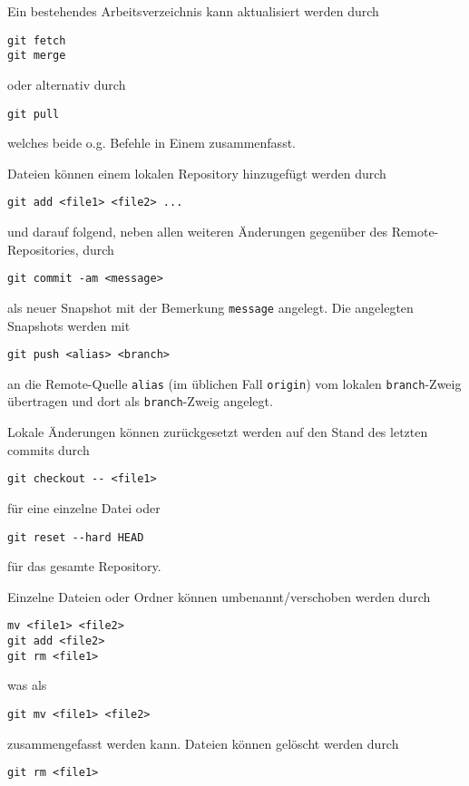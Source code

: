 \documentclass{scrartcl}
\begin{document}
\vspace{1.5\baselineskip}
Ein bestehendes Arbeitsverzeichnis kann aktualisiert werden durch
\begin{lstlisting}
git fetch
git merge
\end{lstlisting} 
oder alternativ durch 
\begin{lstlisting}
git pull
\end{lstlisting} 
welches beide o.g. Befehle in Einem zusammenfasst.

\vspace{1.5\baselineskip}
Dateien können einem lokalen Repository hinzugefügt werden durch
\begin{lstlisting}
git add <file1> <file2> ...
\end{lstlisting}
und darauf folgend, neben allen weiteren Änderungen gegenüber des Remote-Repositories, durch
\begin{lstlisting}
git commit -am <message>
\end{lstlisting}
als neuer Snapshot mit der Bemerkung \texttt{message} angelegt. Die angelegten Snapshots werden mit
\begin{lstlisting}
git push <alias> <branch>
\end{lstlisting}
an die Remote-Quelle \texttt{alias} (im üblichen Fall \texttt{origin}) vom lokalen \texttt{branch}-Zweig übertragen und dort als \texttt{branch}-Zweig angelegt.

\vspace{1.5\baselineskip}
Lokale Änderungen können zurückgesetzt werden auf den Stand des letzten commits durch
\begin{lstlisting}
git checkout -- <file1>
\end{lstlisting}
für eine einzelne Datei oder
\begin{lstlisting}
git reset --hard HEAD
\end{lstlisting}
für das gesamte Repository.

\vspace{1.5\baselineskip}
Einzelne Dateien oder Ordner können umbenannt/verschoben werden durch
\begin{lstlisting}
mv <file1> <file2>
git add <file2>
git rm <file1>
\end{lstlisting}
was als
\begin{lstlisting}
git mv <file1> <file2>
\end{lstlisting}
zusammengefasst werden kann. Dateien können gelöscht werden durch
\begin{lstlisting}
git rm <file1>
\end{lstlisting}
\end{document}
